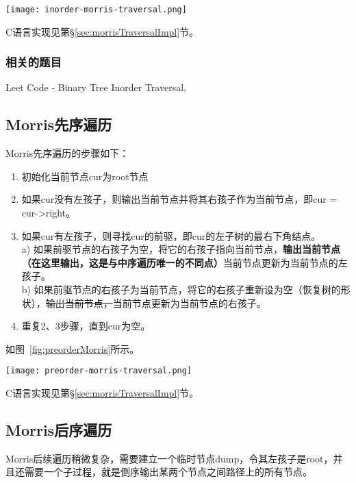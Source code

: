 \begin{center}
\texttt{[image: inorder-morris-traversal.png]} \\
\label{fig:inorderMorris}
\end{center}

C语言实现见第\S\ref{sec:morrisTraversalImpl}节。

\subsubsection{相关的题目}
\begindot
\item Leet Code - Binary Tree Inorder Traversal, 
\myenddot


\subsection{Morris先序遍历}
Morris先序遍历的步骤如下：
\begin{enumerate}
\item 初始化当前节点cur为root节点
\item 如果cur没有左孩子，则输出当前节点并将其右孩子作为当前节点，即cur = cur->right。
\item 如果cur有左孩子，则寻找cur的前驱，即cur的左子树的最右下角结点。\\
   a) 如果前驱节点的右孩子为空，将它的右孩子指向当前节点，\textbf{输出当前节点（在这里输出，这是与中序遍历唯一的不同点）}当前节点更新为当前节点的左孩子。\\
   b) 如果前驱节点的右孩子为当前节点，将它的右孩子重新设为空（恢复树的形状），\sout{输出当前节点，}当前节点更新为当前节点的右孩子。
\item 重复2、3步骤，直到cur为空。
\end{enumerate}
如图~\ref{fig:preorderMorris}所示。

\begin{center}
\texttt{[image: preorder-morris-traversal.png]} \\
\label{fig:preorderMorris}
\end{center}

C语言实现见第\S\ref{sec:morrisTraversalImpl}节。


\subsection{Morris后序遍历}
Morris后续遍历稍微复杂，需要建立一个临时节点dump，令其左孩子是root，并且还需要一个子过程，就是倒序输出某两个节点之间路径上的所有节点。

